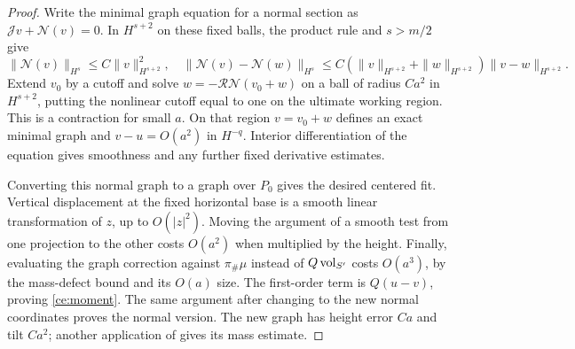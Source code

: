 \begin{proof}
Write the minimal graph equation for a normal section as
$\mathcal Jv+\mathcal N(v)=0$.  In $H^{s+2}$ on these fixed balls,
the product rule and $s>m/2$ give
\[
 \|\mathcal N(v)\|_{H^s}\le C\|v\|_{H^{s+2}}^2,
 \quad
 \|\mathcal N(v)-\mathcal N(w)\|_{H^s}
 \le C(\|v\|_{H^{s+2}}+\|w\|_{H^{s+2}})
           \|v-w\|_{H^{s+2}}.
\]
Extend $v_0$ by a cutoff and solve
$w=-\mathcal R\mathcal N(v_0+w)$ on a ball of radius $Ca^2$ in
$H^{s+2}$, putting the nonlinear cutoff equal to one on the ultimate
working region.  This is a contraction for small $a$.  On that region
$v=v_0+w$ defines an exact minimal graph and
$v-u=O(a^2)$ in $H^{-q}$.  Interior differentiation of the equation
gives smoothness and any further fixed derivative estimates.

Converting this normal graph to a graph over $P_0$ gives the desired
centered fit.  Vertical displacement at the fixed horizontal base is
a smooth linear transformation of $z$, up to $O(|z|^2)$.  Moving the
argument of a smooth test from one projection to the other costs
$O(a^2)$ when multiplied by the height.  Finally, evaluating the graph
correction against $\pi_\#\mu$ instead of $Q\operatorname{vol}_{S'}$ costs
$O(a^3)$, by the mass-defect bound and its $O(a)$ size.  The first-order
term is $Q(u-v)$, proving \eqref{ce:moment}.  The same argument after
changing to the new normal coordinates proves the normal version.
The new graph has height error $Ca$ and tilt $Ca^2$; another application
of  gives its mass estimate.


\end{proof}
